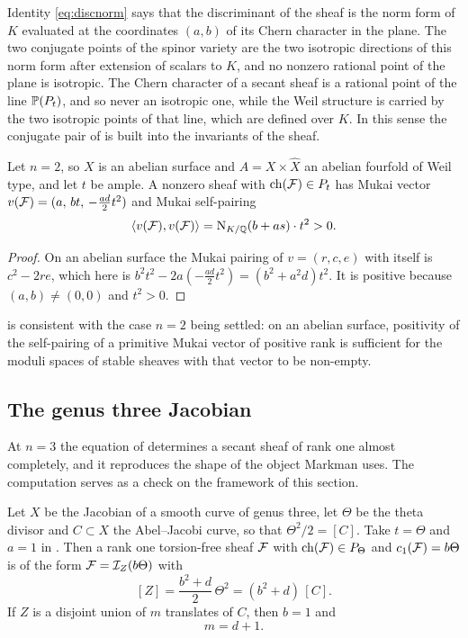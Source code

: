 \begin{remark}\label{rem:normdisc}
Identity \eqref{eq:discnorm} says that the discriminant of the sheaf is the
norm form of $K$ evaluated at the coordinates $(a,b)$ of its Chern character
in the plane. The two conjugate points of the spinor variety are the two
isotropic directions of this norm form after extension of scalars to $K$, and
no nonzero rational point of the plane is isotropic. The Chern character of a
secant sheaf is a rational point of the line $\mathbb{P}(P_{t})$, and so never an
isotropic one, while the Weil structure is carried by the two isotropic points
of that line, which are defined over $K$. In this sense the conjugate pair of
 is built into the invariants of the sheaf.
\end{remark}

\begin{corollary}\label{cor:surfacecase}
Let $n=2$, so $X$ is an abelian surface and $A=X\times\widehat{X}$ an abelian
fourfold of Weil type, and let $t$ be ample. A nonzero sheaf with
$\operatorname{ch}(\mathcal{F})\in P_{t}$ has Mukai vector
$v(\mathcal{F})=(a,\,bt,\,-\tfrac{ad}{2}t^{2})$ and Mukai self-pairing
\[
  \langle v(\mathcal{F}),v(\mathcal{F})\rangle=\mathrm{N}_{K/\mathbb{Q}}(b+as)\cdot t^{2}>0 .
\]
\end{corollary}

\begin{proof}
On an abelian surface the Mukai pairing of $v=(r,c,e)$ with itself is
$c^{2}-2re$, which here is $b^{2}t^{2}-2a(-\tfrac{ad}{2}t^{2})=(b^{2}+a^{2}d)t^{2}$.
It is positive because $(a,b)\ne(0,0)$ and $t^{2}>0$.
\end{proof}

 is consistent with the case $n=2$ being settled: on an
abelian surface, positivity of the self-pairing of a primitive Mukai vector of
positive rank is sufficient for the moduli spaces of stable sheaves with that
vector to be non-empty.

\subsection{The genus three Jacobian}

At $n=3$ the equation of  determines a secant sheaf
of rank one almost completely, and it reproduces the shape of the object
Markman uses. The computation serves as a check on the framework of this
section.

\begin{proposition}[Rank one at $n=3$]\label{prop:genus3}
Let $X$ be the Jacobian of a smooth curve of genus three, let $\Theta$ be the
theta divisor and $C\subset X$ the Abel--Jacobi curve, so that
$\Theta^{2}/2=[C]$. Take $t=\Theta$ and $a=1$ in
. Then a rank one torsion-free sheaf $\mathcal{F}$ with
$\operatorname{ch}(\mathcal{F})\in P_{\Theta}$ and $c_{1}(\mathcal{F})=b\Theta$ is of the form
$\mathcal{F}=\mathcal{I}_{Z}(b\Theta)$ with
\[
  [Z]=\frac{b^{2}+d}{2}\,\Theta^{2}=(b^{2}+d)\,[C].
\]
If $Z$ is a disjoint union of $m$ translates of $C$, then $b=1$ and
\[
  m=d+1 .
\]
\end{proposition}

